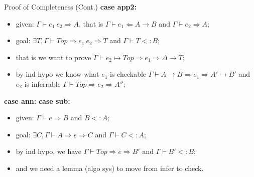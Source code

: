 \begin{frame}{Proof of Completeness (Cont.)}
\textbf{case app2:}
\begin{itemize}
	\item given: $\Gamma \vdash e_1~e_2 \Rightarrow A$, that is $\Gamma \vdash e_1 \Leftarrow A \rightarrow B$ and $\Gamma \vdash e_2 \Rightarrow A$;
	\item goal: $\exists T, \Gamma \vdash Top \Rightarrow e_1~e_2 \Rightarrow T$ and $\Gamma \vdash T <: B$;
		\item that is we want to prove $\Gamma \vdash \boxed{e_2} \mapsto Top \Rightarrow e_1 \Rightarrow \Delta \rightarrow T$;
	\item  by ind hypo we know what $e_1$ is checkable $\Gamma \vdash A \rightarrow B \Rightarrow e_1 \Rightarrow A' \rightarrow B'$ and $e_2$ is inferrable $\Gamma \vdash Top \Rightarrow e_2 \Rightarrow A''$;
\end{itemize}
\noindent\makebox[\linewidth]{\rule{0.9\paperwidth}{0.4pt}}
\textbf{case ann:}
\noindent\makebox[\linewidth]{\rule{0.9\paperwidth}{0.4pt}}
\textbf{case sub:}
\begin{itemize}
	\item given: $\Gamma \vdash e \Rightarrow B$ and $B <: A$;
	\item goal: $\exists C, \Gamma \vdash A \Rightarrow e \Rightarrow C$ and $\Gamma \vdash C <: A$;
	\item by ind hypo, we have $\Gamma \vdash Top \Rightarrow e \Rightarrow B'$ and $\Gamma \vdash B' <: B$;
	\item and we need a lemma (algo sys) to move from infer to check.
\end{itemize}
\end{frame}

